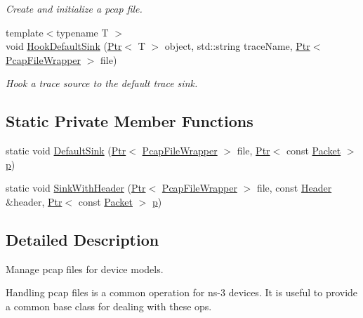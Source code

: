 \begin{DoxyCompactItemize}
\begin{DoxyCompactList}\small\item\em Create and initialize a pcap file. \end{DoxyCompactList}\item 
{\footnotesize template$<$typename T $>$ }\\void \hyperlink{classns3_1_1PcapHelper_a669086eb0eef9105b0f9948f0d6ed180}{Hook\+Default\+Sink} (\hyperlink{classns3_1_1Ptr}{Ptr}$<$ T $>$ object, std\+::string trace\+Name, \hyperlink{classns3_1_1Ptr}{Ptr}$<$ \hyperlink{classns3_1_1PcapFileWrapper}{Pcap\+File\+Wrapper} $>$ file)
\begin{DoxyCompactList}\small\item\em Hook a trace source to the default trace sink. \end{DoxyCompactList}\end{DoxyCompactItemize}
\subsection*{Static Private Member Functions}
\begin{DoxyCompactItemize}
\item 
static void \hyperlink{classns3_1_1PcapHelper_af85e2ac4fa0d875567d130d89cbdcc33}{Default\+Sink} (\hyperlink{classns3_1_1Ptr}{Ptr}$<$ \hyperlink{classns3_1_1PcapFileWrapper}{Pcap\+File\+Wrapper} $>$ file, \hyperlink{classns3_1_1Ptr}{Ptr}$<$ const \hyperlink{classns3_1_1Packet}{Packet} $>$ \hyperlink{lte__link__budget__x2__handover__measures_8m_ac9de518908a968428863f829398a4e62}{p})
\item 
static void \hyperlink{classns3_1_1PcapHelper_a40f244c5388ec870d81e1aebd90e6734}{Sink\+With\+Header} (\hyperlink{classns3_1_1Ptr}{Ptr}$<$ \hyperlink{classns3_1_1PcapFileWrapper}{Pcap\+File\+Wrapper} $>$ file, const \hyperlink{classns3_1_1Header}{Header} \&header, \hyperlink{classns3_1_1Ptr}{Ptr}$<$ const \hyperlink{classns3_1_1Packet}{Packet} $>$ \hyperlink{lte__link__budget__x2__handover__measures_8m_ac9de518908a968428863f829398a4e62}{p})
\end{DoxyCompactItemize}


\subsection{Detailed Description}
Manage pcap files for device models. 

Handling pcap files is a common operation for ns-\/3 devices. It is useful to provide a common base class for dealing with these ops. 


